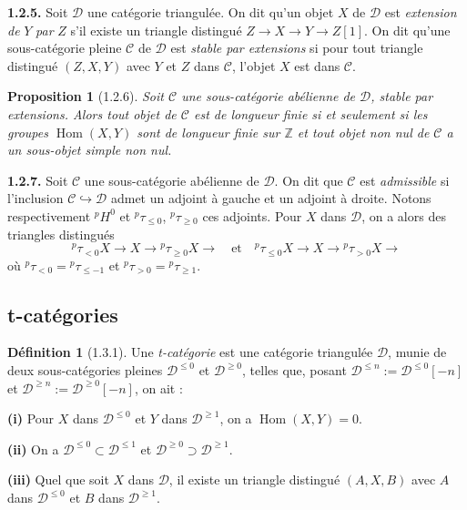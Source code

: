 \documentclass[12pt,a4paper]{article}
\theoremstyle{plain}
\newtheorem{proposition}[theorem]{Proposition}
\theoremstyle{definition}
\newtheorem{definition}[theorem]{Définition}
\theoremstyle{remark}
\DeclareMathOperator{\Hom}{Hom}
\newcommand{\ZZ}{\mathbb{Z}}
\newcommand{\cC}{\mathcal{C}}
\newcommand{\cD}{\mathcal{D}}
\begin{document}
\smallskip

\noindent
\textbf{1.2.5.} Soit $\cD$ une catégorie triangulée. On dit qu'un objet $X$ de $\cD$ est \emph{extension de} $Y$ \emph{par} $Z$ s'il existe un triangle distingué $Z \to X \to Y \to Z[1]$. On dit qu'une sous-catégorie pleine $\cC$ de $\cD$ est \emph{stable par extensions} si pour tout triangle distingué $(Z, X, Y)$ avec $Y$ et $Z$ dans $\cC$, l'objet $X$ est dans $\cC$.

\begin{proposition}[1.2.6]
Soit $\cC$ une sous-catégorie abélienne de $\cD$, stable par extensions. Alors tout objet de $\cC$ est de longueur finie si et seulement si les groupes $\Hom(X, Y)$ sont de longueur finie sur $\ZZ$ et tout objet non nul de $\cC$ a un sous-objet simple non nul.
\end{proposition}

\smallskip

\noindent
\textbf{1.2.7.} Soit $\cC$ une sous-catégorie abélienne de $\cD$. On dit que $\cC$ est \emph{admissible} si l'inclusion $\cC \hookrightarrow \cD$ admet un adjoint à gauche et un adjoint à droite. Notons respectivement ${}^{p}H^{0}$ et ${}^{p}\tau_{\leq 0}$, ${}^{p}\tau_{\geq 0}$ ces adjoints. Pour $X$ dans $\cD$, on a alors des triangles distingués
\[
{}^{p}\tau_{<0}X \to X \to {}^{p}\tau_{\geq 0}X \to
\quad\text{et}\quad
{}^{p}\tau_{\leq 0}X \to X \to {}^{p}\tau_{>0}X \to
\]
où ${}^{p}\tau_{<0} = {}^{p}\tau_{\leq -1}$ et ${}^{p}\tau_{>0} = {}^{p}\tau_{\geq 1}$.

\subsection{t-catégories}

\begin{definition}[1.3.1]
Une \emph{t-catégorie} est une catégorie triangulée $\cD$, munie de deux sous-catégories pleines $\cD^{\leq 0}$ et $\cD^{\geq 0}$, telles que, posant $\cD^{\leq n} := \cD^{\leq 0}[-n]$ et $\cD^{\geq n} := \cD^{\geq 0}[-n]$, on ait :

\smallskip

\noindent
\textbf{(i)} Pour $X$ dans $\cD^{\leq 0}$ et $Y$ dans $\cD^{\geq 1}$, on a $\Hom(X, Y) = 0$.

\noindent
\textbf{(ii)} On a $\cD^{\leq 0} \subset \cD^{\leq 1}$ et $\cD^{\geq 0} \supset \cD^{\geq 1}$.

\noindent
\textbf{(iii)} Quel que soit $X$ dans $\cD$, il existe un triangle distingué $(A, X, B)$ avec $A$ dans $\cD^{\leq 0}$ et $B$ dans $\cD^{\geq 1}$.
\end{definition}
\end{document}
